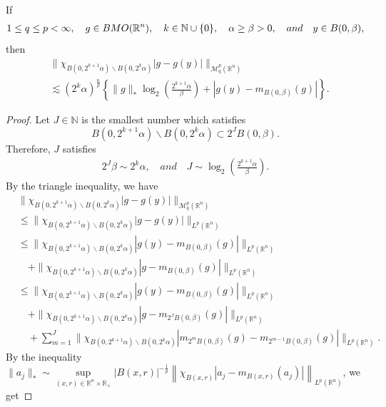 \documentclass[10pt,a4paper]{amsart}
\begin{document}
\begin{lemma}\label{BMO dyadic}
	If
	\begin{align*}
		1 \le q \le p < \infty, \quad g \in {\rm BMO}({\mathbb R}^n), \quad k \in \mathbb N \cup \{0\}, \quad \alpha \ge \beta > 0, \quad and \quad y \in B(0,\beta),
	\end{align*}
	then
	\begin{align*}
		&\| \chi_{B(0,2^{k+1}\alpha) \backslash B(0,2^k\alpha)} |g-g(y)| \|_{{\mathcal M}{}^p_q({\mathbb R}^n)}\\
		&\lesssim (2^{k}\alpha)^{\frac{n}{p}} \left\{ \|g\|_* \log_2\left(\frac{2^{k+1}\alpha}{\beta}\right) + |g(y)-m_{B(0,\beta)}(g)| \right\}.
	\end{align*}
\end{lemma}

\begin{proof}
Let $J \in \mathbb N$ is the smallest number which satisfies
	\[
		B(0,2^{k+1}\alpha) \backslash B(0,2^k\alpha) \subset 2^JB(0,\beta).
	\] 
Therefore, $J$ satisfies  
	\begin{align}
		2^J \beta \sim 2^k \alpha, \quad and \quad J \sim  \log_2\left(\frac{2^{k+1}\alpha}{\beta} \right). \label{123}
	\end{align}
By the triangle inequality, we have 
	\begin{align*}
		&\| \chi_{B(0,2^{k+1}\alpha) \backslash B(0,2^k\alpha)} |g-g(y)| \|_{{\mathcal M}{}^p_q({\mathbb R}^n)}\\
		&\le \| \chi_{B(0,2^{k+1}\alpha) \backslash B(0,2^k\alpha)} |g-g(y)| \|_{L^p({\mathbb R}^n)}\\
		&\le \| \chi_{B(0,2^{k+1}\alpha) \backslash B(0,2^k\alpha)} |g(y)-m_{B(0,\beta)}(g)| \|_{L^p({\mathbb R}^n)}\\
			&\quad+ \| \chi_{B(0,2^{k+1}\alpha) \backslash B(0,2^k\alpha)} |g-m_{B(0,\beta)}(g)| \|_{L^p({\mathbb R}^n)}\\
		&\le \| \chi_{B(0,2^{k+1}\alpha) \backslash B(0,2^k\alpha)} |g(y)-m_{B(0,\beta)}(g)| \|_{L^p({\mathbb R}^n)}\\
			& \quad + \| \chi_{B(0,2^{k+1}\alpha) \backslash B(0,2^k\alpha)} |g-m_{2^JB(0,\beta)}(g)| \|_{L^p({\mathbb R}^n)} \\
			& \quad + \sum_{m=1}^{J} \| \chi_{B(0,2^{k+1}\alpha) \backslash B(0,2^k\alpha)} |m_{2^mB(0,\beta)}(g)-m_{2^{m-1}B(0,\beta)}(g)| \|_{L^p({\mathbb R}^n)}.
	\end{align*}
By the inequality $\|a_j\|_* \sim \sup\limits_{(x,r) \in {\mathbb R}^{n} \times \mathbb{R}_+} |B(x,r)|^{-\frac{1}{p} } \left\| \chi_{B(x,r)}|a_j-m_{B(x,r)}(a_j)| \right\|_{L^p({\mathbb R}^n)}$, we get

\end{proof}
\end{document}
